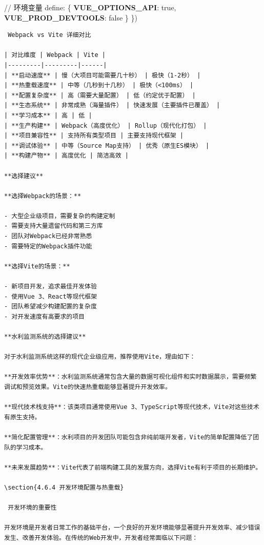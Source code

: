 {{// 环境变量 define: \{ \textbf{VUE\_OPTIONS\_API}: true, \textbf{VUE\_PROD\_DEVTOOLS}: false \} \})

\begin{lstlisting}
 Webpack vs Vite 详细对比

| 对比维度 | Webpack | Vite |
|---------|---------|------|
| **启动速度** | 慢（大项目可能需要几十秒） | 极快（1-2秒） |
| **热重载速度** | 中等（几秒到十几秒） | 极快（<100ms） |
| **配置复杂度** | 高（需要大量配置） | 低（约定优于配置） |
| **生态系统** | 非常成熟（海量插件） | 快速发展（主要插件已覆盖） |
| **学习成本** | 高 | 低 |
| **生产构建** | Webpack（高度优化） | Rollup（现代化打包） |
| **项目兼容性** | 支持所有类型项目 | 主要支持现代框架 |
| **调试体验** | 中等（Source Map支持） | 优秀（原生ES模块） |
| **构建产物** | 高度优化 | 简洁高效 |

**选择建议**

**选择Webpack的场景：**

- 大型企业级项目，需要复杂的构建定制
- 需要支持大量遗留代码和第三方库
- 团队对Webpack已经非常熟悉
- 需要特定的Webpack插件功能

**选择Vite的场景：**

- 新项目开发，追求最佳开发体验
- 使用Vue 3、React等现代框架
- 团队希望减少构建配置的复杂度
- 对开发速度有高要求的项目

**水利监测系统的选择建议**

对于水利监测系统这样的现代企业级应用，推荐使用Vite，理由如下：

**开发效率优势**：水利监测系统通常包含大量的数据可视化组件和实时数据展示，需要频繁调试和预览效果。Vite的快速热重载能够显著提升开发效率。

**现代技术栈支持**：该类项目通常使用Vue 3、TypeScript等现代技术，Vite对这些技术有原生支持。

**简化配置管理**：水利项目的开发团队可能包含非纯前端开发者，Vite的简单配置降低了团队的学习成本。

**未来发展趋势**：Vite代表了前端构建工具的发展方向，选择Vite有利于项目的长期维护。

\section{4.6.4 开发环境配置与热重载}

 开发环境的重要性

开发环境是开发者日常工作的基础平台，一个良好的开发环境能够显著提升开发效率、减少错误发生、改善开发体验。在传统的Web开发中，开发者经常面临以下问题：


\end{lstlisting}}}
